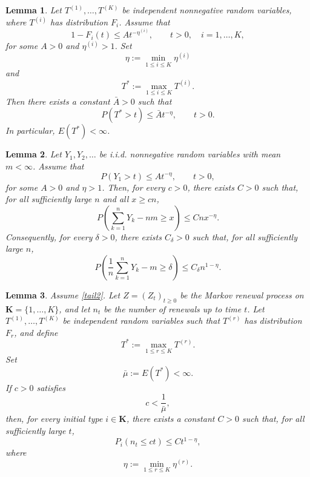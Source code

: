 \documentclass[10pt,a4paper]{amsart}
\newtheorem{lemma}{Lemma}
\begin{document}
\begin{lemma}\label{lemaaux1}
Let \(T^{(1)},\dots,T^{(K)}\) be independent nonnegative random variables, where
\(T^{(i)}\) has distribution \(F_i\). Assume that
\[
1-F_i(t)\le A t^{-\eta^{(i)}},
\qquad t>0,\quad i=1,\dots,K,
\]
for some \(A>0\) and \(\eta^{(i)}>1\). Set
\[
\eta:=\min_{1\le i\le K}\eta^{(i)}
\]
and
\[
T^*:=\max_{1\le i\le K}T^{(i)}.
\]
Then there exists a constant \(\bar A>0\) such that
\begin{equation}\label{eq:max-tail-K}
P(T^*>t)\le \bar A t^{-\eta},
\qquad t>0.
\end{equation}
In particular, \(E(T^*)<\infty\).
\end{lemma}

\begin{lemma}\label{lemaaux2}
Let \(Y_1,Y_2,\dots\) be i.i.d. nonnegative random variables with mean
\(m<\infty\). Assume that
\[
P(Y_1>t)\le A t^{-\eta},
\qquad t>0,
\]
for some \(A>0\) and \(\eta>1\). Then, for every \(c>0\), there exists
\(C>0\) such that, for all sufficiently large \(n\) and all \(x\ge cn\),
\begin{equation}\label{cotaeta1}
P\left(\sum_{k=1}^nY_k-nm\ge x\right)
\le C n x^{-\eta}.
\end{equation}
Consequently, for every \(\delta>0\), there exists \(C_\delta>0\) such that,
for all sufficiently large \(n\),
\begin{equation}\label{cotaeta2}
P\left(\frac1n\sum_{k=1}^nY_k-m\ge\delta\right)
\le C_\delta n^{1-\eta}.
\end{equation}
\end{lemma}

\begin{lemma}\label{lemma3.8}
Assume \eqref{tail2}. Let \(Z=(Z_t)_{t\ge0}\) be the Markov renewal process on
\(\mathbf K=\{1,\dots,K\}\), and let \(n_t\) be the number of renewals up to time \(t\).
Let \(T^{(1)},\dots,T^{(K)}\) be independent random variables such that \(T^{(r)}\) has
distribution \(F_r\), and define
\[
T^*:=\max_{1\le r\le K}T^{(r)}.
\]
Set
\[
\bar\mu:=E(T^*)<\infty.
\]
If \(c>0\) satisfies
\[
c<\frac1{\bar\mu},
\]
then, for every initial type \(i\in\mathbf K\), there exists a constant \(C>0\) such that,
for all sufficiently large \(t\),
\begin{equation}\label{cotan}
P_i(n_t\le ct)
\le
C t^{1-\eta},
\end{equation}
where
\[
\eta:=\min_{1\le r\le K}\eta^{(r)}.
\]
\end{lemma}
\end{document}
